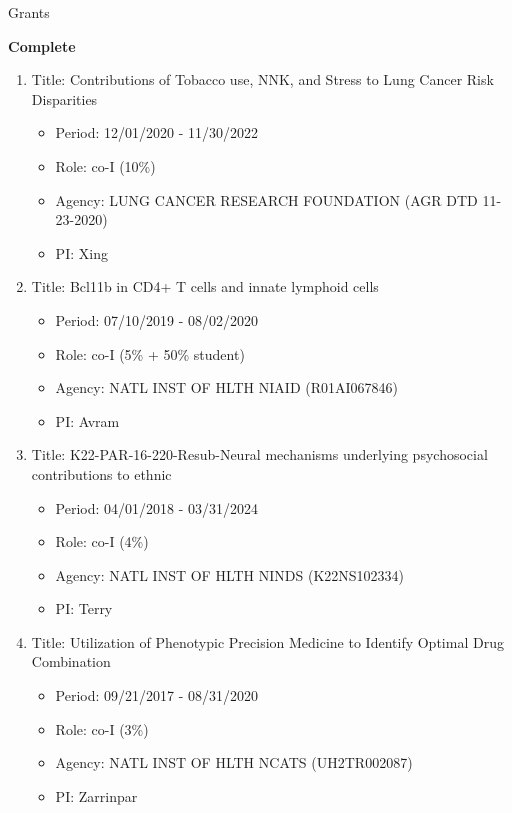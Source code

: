 \documentclass{resume} %
\begin{document}
\begin{rSection}{Grants}
\begin{enumerate}[noitemsep,topsep=0pt]
\end{enumerate}




\textbf{Complete}

\begin{enumerate}[noitemsep,topsep=0pt]
\item Title: Contributions of Tobacco use, NNK, and Stress to Lung Cancer Risk Disparities
\begin{itemize}[noitemsep,topsep=0pt,leftmargin=*]
\item[] Period: 12/01/2020 - 11/30/2022
\item[] Role: co-I (10\%)
\item[] Agency: LUNG CANCER RESEARCH FOUNDATION (AGR DTD 11-23-2020)
\item[] PI: Xing
\end{itemize}

\item Title: Bcl11b in CD4+ T cells and innate lymphoid cells
\begin{itemize}[noitemsep,topsep=0pt,leftmargin=*]
\item[] Period: 07/10/2019 - 08/02/2020
\item[] Role: co-I (5\% + 50\% student)
\item[] Agency: NATL INST OF HLTH NIAID (R01AI067846)
\item[] PI: Avram
\end{itemize}

\item Title: K22-PAR-16-220-Resub-Neural mechanisms underlying psychosocial contributions to ethnic
\begin{itemize}[noitemsep,topsep=0pt,leftmargin=*]
\item[] Period: 04/01/2018 - 03/31/2024
\item[] Role: co-I (4\%)
\item[] Agency: NATL INST OF HLTH NINDS (K22NS102334)
\item[] PI: Terry
\end{itemize}

\item Title: Utilization of Phenotypic Precision Medicine to Identify Optimal Drug Combination
\begin{itemize}[noitemsep,topsep=0pt,leftmargin=*]
\item[] Period: 09/21/2017 - 08/31/2020
\item[] Role: co-I (3\%)
\item[] Agency: NATL INST OF HLTH NCATS (UH2TR002087)
\item[] PI: Zarrinpar
\end{itemize}


\end{enumerate}
\end{rSection}
\end{document}
